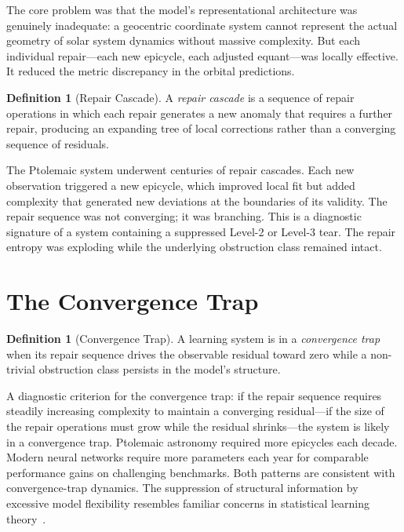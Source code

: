 \documentclass[12pt,oneside]{book}
\theoremstyle{plain}
\theoremstyle{definition}
\newtheorem{definition}[theorem]{Definition}
\theoremstyle{remark}
\newcommand{\1}{\mathbf{1}}
\begin{document}
The core problem was that the model's representational architecture was genuinely inadequate: a geocentric coordinate system cannot represent the actual geometry of solar system dynamics without massive complexity. But each individual repair---each new epicycle, each adjusted equant---was locally effective. It reduced the metric discrepancy in the orbital predictions.

\begin{definition}[Repair Cascade]
A \emph{repair cascade} is a sequence of repair operations in which each repair generates a new anomaly that requires a further repair, producing an expanding tree of local corrections rather than a converging sequence of residuals.
\end{definition}

The Ptolemaic system underwent centuries of repair cascades. Each new observation triggered a new epicycle, which improved local fit but added complexity that generated new deviations at the boundaries of its validity. The repair sequence was not converging; it was branching. This is a diagnostic signature of a system containing a suppressed Level-2 or Level-3 tear. The repair entropy was exploding while the underlying obstruction class remained intact.

\section{The Convergence Trap}

\begin{definition}[Convergence Trap]
A learning system is in a \emph{convergence trap} when its repair sequence drives the observable residual toward zero while a non-trivial obstruction class persists in the model's structure.
\end{definition}

A diagnostic criterion for the convergence trap: if the repair sequence requires steadily increasing complexity to maintain a converging residual---if the size of the repair operations must grow while the residual shrinks---the system is likely in a convergence trap. Ptolemaic astronomy required more epicycles each decade. Modern neural networks require more parameters each year for comparable performance gains on challenging benchmarks. Both patterns are consistent with convergence-trap dynamics. The suppression of structural information by excessive model flexibility resembles familiar concerns in statistical learning theory~\cite{vapnik1998,goodfellow2016}.
\end{document}
